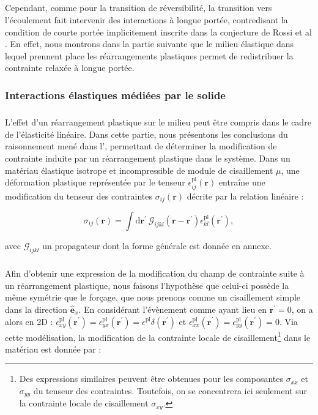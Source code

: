 \subparagraph{}Cependant, comme pour la transition de réversibilité, la transition vers l'écoulement fait intervenir des interactions à longue portée, contredisant la condition de courte portée implicitement inscrite dans la conjecture de Rossi et al \cite{rossi_universality_2000}. En effet, nous montrons dans la partie suivante que le milieu élastique dans lequel prennent place les réarrangements plastiques permet de redistribuer la contrainte relaxée à longue portée.

\subsubsection{Interactions élastiques médiées par le solide}

\label{sec:ref_interac_elast}

\subparagraph{}L'effet d'un réarrangement plastique sur le milieu peut être compris dans le cadre de l'élasticité linéaire. Dans cette partie, nous présentons les conclusions du raisonnement mené dans l', permettant de déterminer la modification de contrainte induite par un réarrangement plastique dans le système. Dans un matériau élastique isotrope et incompressible de module de cisaillement $\mu$, une déformation plastique représentée par le tenseur $\epsilon_{ij}^\text{pl}(\mathbf{r})$ entraîne une modification du tenseur des contraintes $\sigma_{ij}(\mathbf{r})$ décrite par la relation linéaire :

\begin{equation}
	\sigma_{ij}(\mathbf{r}) = \int\mathrm{d}\mathbf{r}^\prime~ \mathcal{G}_{ijkl}(\mathbf{r}-\mathbf{r}^\prime)\epsilon^\text{pl}_{kl}(\mathbf{r}^\prime),
\end{equation}

\noindent avec $\mathcal{G}_{ijkl}$ un propagateur dont la forme générale est donnée en annexe.

\subparagraph{}Afin d'obtenir une expression de la modification du champ de contrainte suite à un réarrangement plastique, nous faisons l'hypothèse que celui-ci possède la même symétrie que le forçage, que nous prenons comme un cisaillement simple dans la direction $\hat{\mathbf{e}}_x$. En considérant l'évènement comme ayant lieu en $\mathbf{r}^\prime = 0$, on a alors en 2D : $\epsilon_{xy}^\text{pl}(\mathbf{r}^\prime) = \epsilon_{yx}^\text{pl}(\mathbf{r}^\prime) = \epsilon^\text{pl}\delta(\mathbf{r}^\prime)$ et $\epsilon_{xx}^\text{pl}(\mathbf{r}^\prime) = \epsilon_{yy}^\text{pl}(\mathbf{r}^\prime) = 0$. Via cette modélisation, la modification de la contrainte locale de cisaillement\footnote{Des expressions similaires peuvent être obtenues pour les composantes $\sigma_{xx}$ et $\sigma_{yy}$ du tenseur des contraintes. Toutefois, on se concentrera ici seulement sur la contrainte locale de cisaillement $\sigma_{xy}$.} dans le matériau est donnée par :

